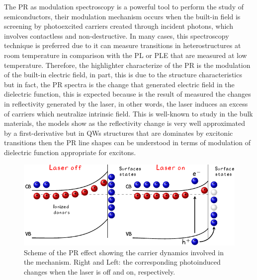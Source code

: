 The PR as modulation spectroscopy is a powerful tool to perform the study of semiconductors, their modulation mechanism occurs when the built-in field is screening by photoexcited carriers created through incident photons, which involves contactless and non-destructive.  In many cases, this spectroscopy technique is preferred due to it can measure transitions in heterostructures at room temperature in comparison with the PL or PLE\cite{shanabrook1987photoreflectance} that are measured at low temperature. Therefore, the highlighter characterize of the PR is the modulation of the built-in electric field, in part, this is due to the structure characteristics but in fact, the PR spectra is the change that generated electric field in the dielectric function, this is expected because is the result of measured the changes in reflectivity generated by the laser, in other words, the laser induces an excess of carriers which neutralize intrinsic field. This is well-known to study in the bulk materials, the models show as the reflectivity change is very well approximated by a first-derivative\cite{seraphin1972electric,aspnes1973surface,misiewicz1999photoreflectance,sydor1989photoreflectanceinterfaces}  but in QWs structures that are dominates by excitonic transitions then the PR line shapes can be understood in terms of modulation of dielectric function appropriate for excitons\cite{shanabrook1987photoreflectance,theis1988excitonic,theis1989extrinsic,gontijo1994photoreflectance}. 

\begin{figure}[ht!]
	\centering
	\includegraphics[width=\textwidth]{../figures/chapter-3/pr-modulation/build/pr-modulation.pdf}
	\caption{Scheme of the PR effect showing the carrier dynamics involved in the mechanism. Right and Left: the corresponding photoinduced changes when the laser is off and on, respectively. }
	\label{fig:chapter-3-PR-MODULATION-MECHANISM}
\end{figure}

